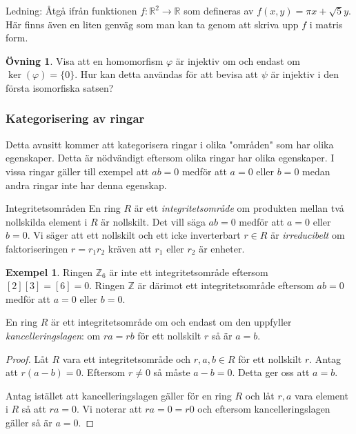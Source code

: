 \documentclass{article}
\theoremstyle{definition}
\newtheorem{ovning}[thm]{Övning}
\newtheorem{exmp}[thm]{Exempel}
\begin{document}
Ledning: Åtgå ifrån funktionen $f: \mathbb{R}^2 \rightarrow \mathbb{R}$ som defineras av $f(x, y) = \pi x + \sqrt 5 y$. 
Här finns även en liten genväg som man kan ta genom att skriva upp $f$ i matris form. 

\begin{ovning}
  Visa att en homomorfism $\varphi$ är injektiv om och endast om $\ker(\varphi) = \{0\}.$ Hur kan detta användas för att bevisa att 
  $\psi$ är injektiv i den första isomorfiska satsen?
\end{ovning}

\subsubsection{Kategorisering av ringar}
Detta avnsitt kommer att kategorisera ringar i olika "områden" som har olika egenskaper. 
Detta är nödvändigt eftersom olika ringar har olika egenskaper. I vissa ringar gäller till exempel att 
$ab = 0$ medför att $a = 0$ eller $b = 0$ medan andra ringar inte har denna egenskap.

\begin{mydef}{Integritetsområden}{}
  En ring $R$ är ett \textit{integritetsområde} om produkten mellan två nollskilda element i $R$ är nollskilt. Det vill säga $ab = 0$ 
  medför att $a = 0$ eller $b = 0$. Vi säger att ett nollskilt och ett icke inverterbart $r \in R$ är \textit{irreducibelt} om 
  faktoriseringen $r = r_1r_2$ kräven att $r_1$ eller $r_2$ är enheter. 
\end{mydef}

\begin{exmp}
  Ringen $\mathbb{Z}_6$ är inte ett integritetsområde eftersom $[2][3] = [6] = 0$. Ringen $\mathbb{Z}$ är därimot ett integritetsområde 
  eftersom $ab = 0$ medför att $a = 0$ eller $b = 0$.
\end{exmp}

\hypertarget{kancelleringslagen}{}
\begin{mytheo}{}{}
  En ring $R$ är ett integritetsområde om och endast om den uppfyller \textit{kancelleringslagen}: om $ra = rb$ för ett nollskilt $r$
  så är $a = b$.
\end{mytheo}

\begin{proof}
  Låt $R$ vara ett integritetsområde och $r, a, b \in R$ för ett nollskilt $r$. Antag att $r(a -b) = 0$. Eftersom $r \neq 0$
  så måste $a -b = 0$. Detta ger oss att $a = b$. 

  Antag istället att kancelleringslagen gäller för en ring $R$ och låt $r, a$ vara element i $R$ så att $ra = 0.$
  Vi noterar att $ra = 0 = r0$ och eftersom kancelleringslagen gäller så är $a = 0$. 
\end{proof}
\end{document}
